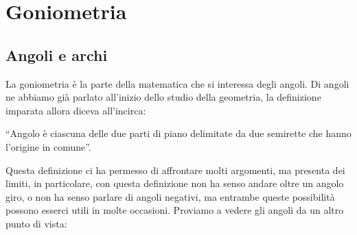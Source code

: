 



\chapter{Goniometria}

\section{Angoli e archi}
\label{sec:gonio_angoli_archi}

%  
%  
% 
%  

La goniometria è la parte della matematica che si interessa degli angoli. 
Di angoli ne abbiamo già parlato all'inizio dello studio della geometria, 
la definizione imparata allora diceva all'incirca:

``Angolo è ciascuna delle due parti di piano delimitate da due semirette
che hanno l'origine in comune''.

Questa definizione ci ha permesso di affrontare molti argomenti, ma presenta 
dei limiti, in particolare, con questa definizione non ha senso andare oltre
un angolo giro, o non ha senso parlare di angoli negativi, ma entrambe queste 
possibilità possono esserci utili in molte occasioni. 
Proviamo a vedere gli angoli da un altro punto di vista:

